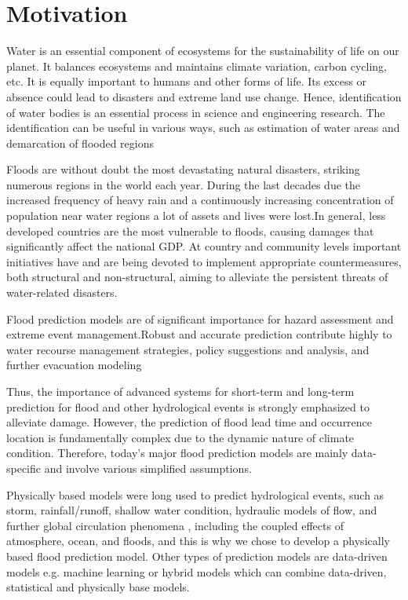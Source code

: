 \documentclass[12pt, a4paper]{report}
\begin{document}
\setcounter{page}{1}


\section{Motivation}
\quad
Water is an essential component of ecosystems for the sustainability of life on our planet. It balances ecosystems and maintains climate variation, carbon cycling, etc. It is equally important to humans and other forms of life. Its excess or absence could lead to disasters and extreme land use change. Hence, identification of water bodies is an essential process in science and engineering research. The identification can be useful in various ways, such as estimation of water areas and demarcation of flooded regions\cite{1,2}
\par 

Floods are without doubt the most devastating natural disasters, striking numerous regions in the world each year. During the last decades due the increased frequency of heavy rain and a continuously increasing concentration of population near water regions a lot of assets and lives were lost.In general, less developed countries are the most vulnerable to floods, causing damages that significantly affect the national GDP. At country and community levels important initiatives have and are being devoted to implement appropriate countermeasures, both structural and non-structural, aiming to alleviate the persistent threats of water-related disasters. 
\par

Flood prediction models are of significant importance for hazard assessment and extreme event management.Robust and accurate prediction contribute highly to water recourse management strategies, policy suggestions and analysis, and further evacuation modeling\cite{3}
\par

Thus, the importance of advanced systems for short-term and long-term prediction for flood and other hydrological events is strongly emphasized to alleviate damage\cite{4}. However, the prediction of flood lead time and occurrence location is fundamentally complex due to the dynamic nature of climate condition. Therefore, today’s major flood prediction models are mainly data-specific and involve various simplified assumptions.\cite{5}
\par

Physically based models were long used to predict hydrological events, such as storm, rainfall/runoff, shallow water condition, hydraulic models of flow, and further global circulation phenomena , including the coupled effects of atmosphere, ocean, and floods, and this is why we chose to develop a physically based flood prediction model. Other types of prediction models are data-driven models e.g. machine learning or hybrid models which can combine data-driven, statistical and physically base models.
\par 
\end{document}
